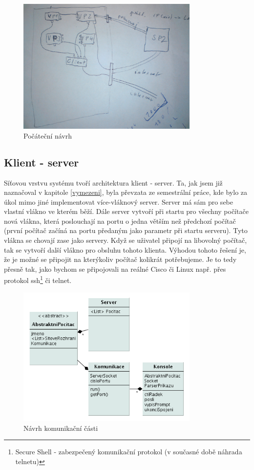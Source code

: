 \begin{figure}[h]
\begin{center}
\includegraphics[width=9cm]{figures/navrh}
\caption{Počáteční návrh}
\label{fig:navrh}
\end{center}
\end{figure}


\subsection{Klient - server}\label{klien_server}
Síťovou vrstvu systému tvoří architektura klient - server. Ta, jak jsem již naznačoval v kapitole \ref{vymezeni}, byla převzata ze semestrální práce, kde bylo za úkol mimo jiné implementovat více-vláknový server. Server má sám pro sebe vlastní vlákno ve kterém běží. Dále server vytvoří při startu pro všechny počítače nová vlákna, která poslouchají na portu o jedna větším než předchozí počítač (první počítač začíná na portu předaným jako parametr při startu serveru). Tyto vlákna se chovají zase jako servery. Když se uživatel připojí na libovolný počítač, tak se vytvoří další vlákno pro obsluhu tohoto klienta. Výhodou tohoto řešení je, že je možné se připojit na kterýkoliv počítač kolikrát potřebujeme. Je to tedy přesně tak, jako bychom se připojovali na reálné Cisco či Linux např. přes protokol ssh\footnote{Secure Shell - zabezpečený komunikační protokol (v současné době náhrada telnetu)} či telnet.

\begin{figure}[h]
\begin{center}
\includegraphics[width=9cm]{figures/uml_sit2}
\caption{Návrh komunikační části}
\label{uml:sit}
\end{center}
\end{figure}

